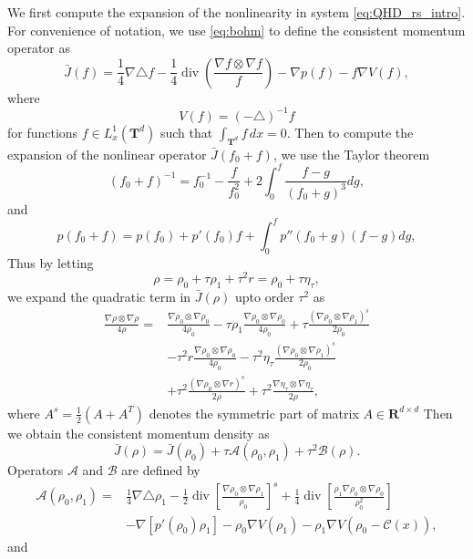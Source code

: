 \documentclass[english]{amsart}
\theoremstyle{plain}
\theoremstyle{definition}
\theoremstyle{remark}
\theoremstyle{plain}
\theoremstyle{plain}
\theoremstyle{plain}
\def\R{{\mathbf R}}%
\def\T{{\mathbf T}}%
\DeclareMathOperator{\diver}{div}
\numberwithin{equation}{section}
\begin{document}
We first compute the expansion of the nonlinearity in system \eqref{eq:QHD_rs_intro}. 
For convenience of notation, we use \eqref{eq:bohm} to define the consistent momentum operator as
\begin{equation}\label{eq:opbarJ}
\bar J(f)=\frac14\nabla\triangle f-\frac14\diver\left(\frac{\nabla f\otimes\nabla f}{f}\right)-\nabla p(f)-f\nabla V(f),
\end{equation}
where
\[
V(f)=(-\triangle)^{-1}f
\]
for functions $f\in L^1_x({\T^d})$ such that $\int_{\T^d} f\,dx=0$.  
Then to compute the expansion of the nonlinear operator $\bar J(f_0+f)$, we use the Taylor theorem
\[
(f_0+f)^{-1}=f_0^{-1}-\frac{f}{f_0^2}+2\int_0^f\frac{f-g}{(f_0+g)^3}dg,
\]
and
\[
p(f_0+f)=p(f_0)+p'(f_0)f+\int_0^f p''(f_0+g)(f-g)dg,
\]
Thus by letting 
\[
\rho=\rho_0+\tau\rho_{1}+\tau^2 r=\rho_0+\tau \eta_\tau,
\]
we expand the quadratic term in $\bar J(\rho)$ upto order $\tau^2$ as
\begin{align*}
\frac{\nabla\rho\otimes\nabla\rho}{4\rho}
=&\frac{\nabla\rho_0\otimes \nabla\rho_0}{4\rho_0}-\tau\rho_1\frac{\nabla\rho_0\otimes \nabla\rho_0}{4\rho_0}+\tau\frac{(\nabla\rho_0\otimes \nabla\rho_1)^s}{2\rho_0}\\
&-\tau^2 r\frac{\nabla\rho_0\otimes \nabla\rho_0}{4\rho_0}-\tau^2\eta_\tau\frac{(\nabla\rho_0\otimes \nabla\rho_1)^s}{2\rho_0}\\
&+\tau^2\frac{(\nabla\rho_0\otimes \nabla r)^s}{2\rho}+\tau^2\frac{\nabla\eta_\tau\otimes \nabla\eta_\tau}{2\rho},
\end{align*}
where $A^s=\frac12(A+A^T)$ denotes the symmetric part of matrix $A\in\R^{d\times d}$
Then we obtain the consistent momentum density as
\begin{equation}\label{eq:expdbarJ}
\bar J(\rho)=\bar J(\rho_0)+\tau \mathcal{A}(\rho_0,\rho_1)+\tau^2 \mathcal{B}(\rho).
\end{equation}
Operators $\mathcal{A}$ and $\mathcal{B}$ are defined by
\begin{equation}\label{eq:opA}
\begin{aligned}
\mathcal{A}(\rho_0,\rho_1)=&\frac14\nabla\triangle\rho_1-\frac12\diver\left[\frac{\nabla \rho_0\otimes\nabla\rho_1}{\rho_0}\right]^s+\frac14\diver\left[\frac{\rho_1\nabla \rho_0\otimes\nabla\rho_0}{\rho_0^2}\right]\\
&-\nabla[p'(\rho_0)\rho_1]-\rho_0\nabla V(\rho_1)-\rho_1\nabla V(\rho_0-\mathcal{C}(x)),
\end{aligned}
\end{equation}
and
\end{document}
